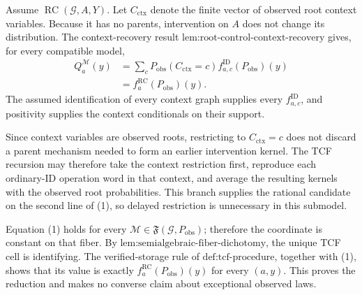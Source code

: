 Assume \(\operatorname{RC}(\mathcal G,A,Y)\). Let \(C_{\mathrm{ctx}}\) denote the finite vector of observed root context variables. Because it has no parents, intervention on \(A\) does not change its distribution. The context-recovery result \(\text{lem:root-control-context-recovery}\) gives, for every compatible model,
\[
\begin{aligned}
Q_a^{\mathcal M}(y)
&=\sum_cP_{\mathrm{obs}}(C_{\mathrm{ctx}}=c)
f_{a,c}^{\mathrm{ID}}(P_{\mathrm{obs}})(y)\\
&=f_a^{\mathrm{RC}}(P_{\mathrm{obs}})(y).
\end{aligned}
\tag{1}
\]
The assumed identification of every context graph supplies every \(f_{a,c}^{\mathrm{ID}}\), and positivity supplies the context conditionals on their support.

Since context variables are observed roots, restricting to \(C_{\mathrm{ctx}}=c\) does not discard a parent mechanism needed to form an earlier intervention kernel. The TCF recursion may therefore take the context restriction first, reproduce each ordinary-ID operation word in that context, and average the resulting kernels with the observed root probabilities. This branch supplies the rational candidate on the second line of (1), so delayed restriction is unnecessary in this submodel.

Equation (1) holds for every \(\mathcal M\in\mathfrak F(\mathcal G,P_{\mathrm{obs}})\); therefore the coordinate is constant on that fiber. By \(\text{lem:semialgebraic-fiber-dichotomy}\), the unique TCF cell is identifying. The verified-storage rule of \(\text{def:tcf-procedure}\), together with (1), shows that its value is exactly \(f_a^{\mathrm{RC}}(P_{\mathrm{obs}})(y)\) for every \((a,y)\). This proves the reduction and makes no converse claim about exceptional observed laws.